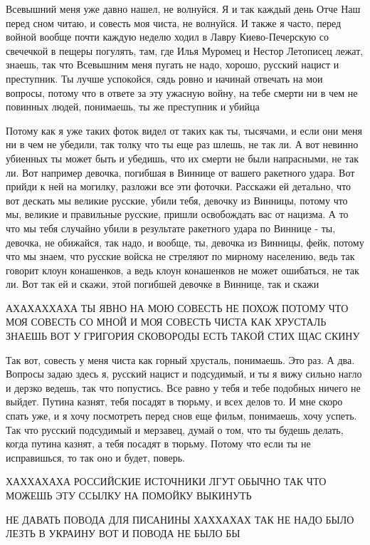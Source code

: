 Всевышний меня уже давно нашел, не волнуйся. Я и так каждый день Отче Наш перед
сном читаю, и совесть моя чиста, не волнуйся. И также я часто, перед войной
вообще почти каждую неделю ходил в Лавру Киево-Печерскую со свечечкой в пещеры
погулять, там, где Илья Муромец и Нестор Летописец лежат, знаешь, так что
Всевышним меня пугать не надо, хорошо, русский нацист и преступник. Ты лучше
успокойся, сядь ровно и начинай отвечать на мои вопросы, потому что в ответе за
эту ужасную войну, на тебе смерти ни в чем не повинных людей, понимаешь, ты же
преступник и убийца

Потому как я уже таких фоток видел от таких как ты, тысячами, и если они меня ни
в чем не убедили, так толку что ты еще раз шлешь, не так ли. А вот невинно
убиенных ты может быть и убедишь, что их смерти не были напрасными, не так ли.
Вот например девочка, погибшая в Виннице от вашего ракетного удара. Вот прийди
к ней на могилку, разложи все эти фоточки. Расскажи ей детально, что вот
дескать мы великие русские, убили тебя, девочку из Винницы, потому что мы,
великие и правильные русские, пришли освобождать вас от нацизма. А то что мы
тебя случайно убили в результате ракетного удара по Виннице - ты, девочка, не
обижайся, так надо, и вообще, ты, девочка из Винницы, фейк, потому что мы
знаем, что русские войска не стреляют по мирному населению, ведь так говорит
клоун конашенков, а ведь клоун конашенков не может ошибаться, не так ли. Вот
так ей и скажи, этой погибшей девочке в Виннице, так и скажи

АХАХАХХАХА ТЫ ЯВНО НА МОЮ СОВЕСТЬ НЕ ПОХОЖ ПОТОМУ ЧТО МОЯ СОВЕСТЬ СО МНОЙ И МОЯ
СОВЕСТЬ ЧИСТА КАК ХРУСТАЛЬ ЗНАЕШЬ ВОТ У ГРИГОРИЯ СКОВОРОДЫ ЕСТЬ ТАКОЙ СТИХ ЩАС
СКИНУ

Так вот, совесть у меня чиста как горный хрусталь, понимаешь. Это раз. А два.
Вопросы задаю здесь я, русский нацист и подсудимый, и ты я вижу сильно нагло и
дерзко ведешь, так что попустись. Все равно у тебя и тебе подобных ничего не
выйдет. Путина казнят, тебя посадят в тюрьму, и всех делов то. И мне скоро
спать уже, и я хочу посмотреть перед снов еще фильм, понимаешь, хочу успеть.
Так что русский подсудимый и мерзавец, думай о том, что ты будешь делать, когда
путина казнят, а тебя посадят в тюрьму. Потому что если ты не исправишься, то
так оно и будет, поверь.

ХАХХАХАХА РОССИЙСКИЕ ИСТОЧНИКИ ЛГУТ ОБЫЧНО ТАК ЧТО МОЖЕШЬ ЭТУ ССЫЛКУ НА ПОМОЙКУ
ВЫКИНУТЬ

НЕ ДАВАТЬ ПОВОДА ДЛЯ ПИСАНИНЫ ХАХХАХАХ ТАК НЕ НАДО БЫЛО ЛЕЗТЬ В УКРАИНУ ВОТ И
ПОВОДА НЕ БЫЛО БЫ

